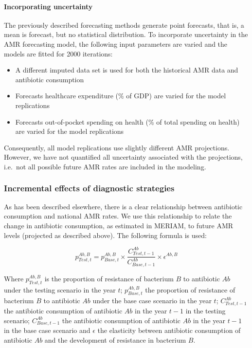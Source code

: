 \documentclass[
]{article}
\begin{document}
\hypertarget{incorporating-uncertainty}{%
\paragraph{Incorporating uncertainty}\label{incorporating-uncertainty}}

The previously described forecasting methods generate point forecasts, that is, a mean is forecast, but no statistical distribution. To incorporate uncertainty in the AMR forecasting model, the following input parameters are varied and the models are fitted for 2000 iterations:

\begin{itemize}
\item
  A different imputed data set is used for both the historical AMR data and antibiotic consumption
\item
  Forecasts healthcare expenditure (\% of GDP) are varied for the model replications
\item
  Forecasts out-of-pocket spending on health (\% of total spending on health) are varied for the model replications
\end{itemize}

Consequently, all model replications use slightly different AMR projections. However, we have not quantified all uncertainty associated with the projections, i.e.~not all possible future AMR rates are included in the modeling.

\hypertarget{incremental-effects-of-diagnostic-strategies}{%
\subsubsection{Incremental effects of diagnostic strategies}\label{incremental-effects-of-diagnostic-strategies}}

As has been described elsewhere, there is a clear relationship between antibiotic consumption and national AMR rates\autocite{goossensOutpatientAntibioticUse2005,cecchiniLowvalueHealthCare2017}. We use this relationship to relate the change in antibiotic consumption, as estimated in MERIAM, to future AMR levels (projected as described above). The following formula is used:

\[
p_{Test,t}^{Ab,B} = p_{Base,t}^{Ab,B} \times \frac{C_{Test,t-1}^{Ab}}{C_{Base,t-1}^{Ab}} \times \epsilon^{Ab,B}
\]

Where \(p_{Test,t}^{Ab,B}\) is the proportion of resistance of bacterium \(B\) to antibiotic \(Ab\) under the testing scenario in the year \(t\); \(p_{Base,t}^{Ab,B}\) the proportion of resistance of bacterium \(B\) to antibiotic \(Ab\) under the base case scenario in the year \(t\); \(C_{Test,t-1}^{Ab}\) the antibiotic consumption of antibiotic \(Ab\) in the year \(t-1\) in the testing scenario; \(C_{Base,t-1}^{Ab}\) the antibiotic consumption of antibiotic \(Ab\) in the year \(t-1\) in the base case scenario and \(\epsilon\) the elasticity between antibiotic consumption of antibiotic \(Ab\) and the development of resistance in bacterium \(B\).
\end{document}
